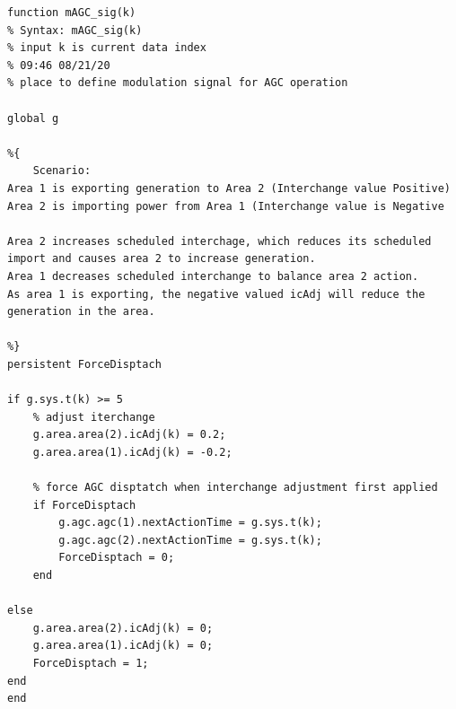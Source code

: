 \begin{verbatim}
function mAGC_sig(k)
% Syntax: mAGC_sig(k)
% input k is current data index
% 09:46 08/21/20
% place to define modulation signal for AGC operation

global g

%{
    Scenario:
Area 1 is exporting generation to Area 2 (Interchange value Positive)
Area 2 is importing power from Area 1 (Interchange value is Negative

Area 2 increases scheduled interchage, which reduces its scheduled import and causes area 2 to increase generation.
Area 1 decreases scheduled interchange to balance area 2 action.
As area 1 is exporting, the negative valued icAdj will reduce the generation in the area.

%}
persistent ForceDisptach

if g.sys.t(k) >= 5
    % adjust iterchange 
    g.area.area(2).icAdj(k) = 0.2;
    g.area.area(1).icAdj(k) = -0.2;
    
    % force AGC disptatch when interchange adjustment first applied
    if ForceDisptach
        g.agc.agc(1).nextActionTime = g.sys.t(k);
        g.agc.agc(2).nextActionTime = g.sys.t(k);
        ForceDisptach = 0;
    end
    
else
    g.area.area(2).icAdj(k) = 0;
    g.area.area(1).icAdj(k) = 0;
    ForceDisptach = 1;
end
end
\end{verbatim}
